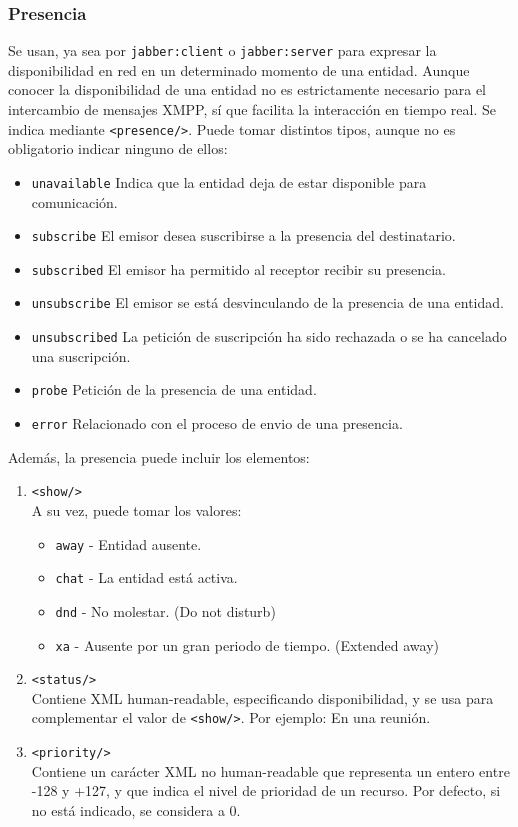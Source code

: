 \documentclass[a4paper, 11pt]{article} %
\begin{document}
    \subsubsection{Presencia}
      Se usan, ya sea por \texttt{jabber:client} o \texttt{jabber:server} para expresar la disponibilidad en red en un
      determinado momento de una entidad. Aunque conocer la disponibilidad de una entidad no es estrictamente
      necesario para el intercambio de mensajes XMPP, sí que facilita la interacción en tiempo real. Se indica 
      mediante \texttt{<presence/>}. Puede tomar distintos tipos, aunque no es obligatorio indicar ninguno de ellos:
      
      \begin{itemize}
      \item \texttt{unavailable} Indica que la entidad deja de estar disponible para comunicación.
      \item \texttt{subscribe} El emisor desea suscribirse a la presencia del destinatario. %
      \item \texttt{subscribed} El emisor ha permitido al receptor recibir su presencia.
      \item \texttt{unsubscribe} El emisor se está desvinculando de la presencia de una entidad.
      \item \texttt{unsubscribed} La petición de suscripción ha sido rechazada o se ha cancelado una suscripción.
      \item \texttt{probe} Petición de la presencia de una entidad.
      \item \texttt{error} Relacionado con el proceso de envio de una presencia.
      \end{itemize}
      
      Además, la presencia puede incluir los elementos:
      \begin{enumerate}
	\item \texttt{<show/>}\\
	A su vez, puede tomar los valores:
	\begin{itemize}
	  \item \texttt{away} - Entidad ausente.
	  \item \texttt{chat} - La entidad está activa.
	  \item \texttt{dnd} - No molestar. (Do not disturb)
	  \item \texttt{xa} - Ausente por un gran periodo de tiempo. (Extended away)
	\end{itemize}
	
	\item \texttt{<status/>}\\
	Contiene XML human-readable, especificando disponibilidad, y se usa para complementar el valor de \texttt{<show/>}.
	Por ejemplo: En una reunión.
	
	\item \texttt{<priority/>}\\
	Contiene un carácter XML no human-readable que representa un entero entre -128 y +127, y que indica el nivel
	de prioridad de un recurso. Por defecto, si no está indicado, se considera a 0.
      \end{enumerate}
\end{document}
